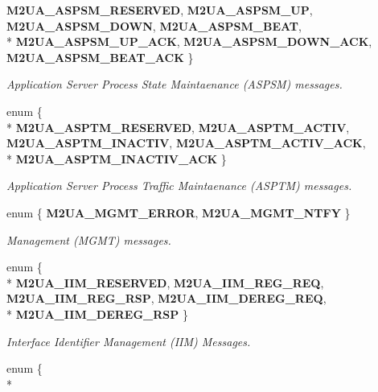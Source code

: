 \begin{DoxyCompactItemize}
{\bf M2\+U\+A\+\_\+\+A\+S\+P\+S\+M\+\_\+\+R\+E\+S\+E\+R\+V\+ED}, 
{\bf M2\+U\+A\+\_\+\+A\+S\+P\+S\+M\+\_\+\+UP}, 
{\bf M2\+U\+A\+\_\+\+A\+S\+P\+S\+M\+\_\+\+D\+O\+WN}, 
{\bf M2\+U\+A\+\_\+\+A\+S\+P\+S\+M\+\_\+\+B\+E\+AT}, 
\\*
{\bf M2\+U\+A\+\_\+\+A\+S\+P\+S\+M\+\_\+\+U\+P\+\_\+\+A\+CK}, 
{\bf M2\+U\+A\+\_\+\+A\+S\+P\+S\+M\+\_\+\+D\+O\+W\+N\+\_\+\+A\+CK}, 
{\bf M2\+U\+A\+\_\+\+A\+S\+P\+S\+M\+\_\+\+B\+E\+A\+T\+\_\+\+A\+CK}
 \}\begin{DoxyCompactList}\small\item\em Application Server Process State Maintaenance (A\+S\+P\+SM) messages. \end{DoxyCompactList}
\item 
enum \{ \\*
{\bf M2\+U\+A\+\_\+\+A\+S\+P\+T\+M\+\_\+\+R\+E\+S\+E\+R\+V\+ED}, 
{\bf M2\+U\+A\+\_\+\+A\+S\+P\+T\+M\+\_\+\+A\+C\+T\+IV}, 
{\bf M2\+U\+A\+\_\+\+A\+S\+P\+T\+M\+\_\+\+I\+N\+A\+C\+T\+IV}, 
{\bf M2\+U\+A\+\_\+\+A\+S\+P\+T\+M\+\_\+\+A\+C\+T\+I\+V\+\_\+\+A\+CK}, 
\\*
{\bf M2\+U\+A\+\_\+\+A\+S\+P\+T\+M\+\_\+\+I\+N\+A\+C\+T\+I\+V\+\_\+\+A\+CK}
 \}\begin{DoxyCompactList}\small\item\em Application Server Process Traffic Maintaenance (A\+S\+P\+TM) messages. \end{DoxyCompactList}
\item 
enum \{ {\bf M2\+U\+A\+\_\+\+M\+G\+M\+T\+\_\+\+E\+R\+R\+OR}, 
{\bf M2\+U\+A\+\_\+\+M\+G\+M\+T\+\_\+\+N\+T\+FY}
 \}\begin{DoxyCompactList}\small\item\em Management (M\+G\+MT) messages. \end{DoxyCompactList}
\item 
enum \{ \\*
{\bf M2\+U\+A\+\_\+\+I\+I\+M\+\_\+\+R\+E\+S\+E\+R\+V\+ED}, 
{\bf M2\+U\+A\+\_\+\+I\+I\+M\+\_\+\+R\+E\+G\+\_\+\+R\+EQ}, 
{\bf M2\+U\+A\+\_\+\+I\+I\+M\+\_\+\+R\+E\+G\+\_\+\+R\+SP}, 
{\bf M2\+U\+A\+\_\+\+I\+I\+M\+\_\+\+D\+E\+R\+E\+G\+\_\+\+R\+EQ}, 
\\*
{\bf M2\+U\+A\+\_\+\+I\+I\+M\+\_\+\+D\+E\+R\+E\+G\+\_\+\+R\+SP}
 \}\begin{DoxyCompactList}\small\item\em Interface Identifier Management (I\+IM) Messages. \end{DoxyCompactList}
\item 
enum \{ \\*

\end{DoxyCompactItemize}
